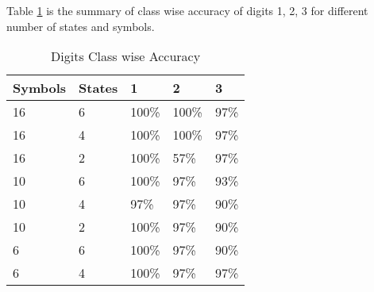 Table \ref{table:1} is the summary of class wise accuracy of digits 1, 2, 3 for different number of states and symbols.

\hspace*{-1cm}\begin{table}[h]
	\centering
	\begin{tabular}{|l|l|l|l|l|}
		\hline

\textbf{Symbols} & \textbf{States} & \textbf{1} & \textbf{2} & \textbf{3} \\		\hline		\hline
16               & 6               & 100\%          & 100\%          & 97\%       \\		\hline
16               & 4               & 100\%          & 100\%          & 97\%       \\		\hline
16               & 2               & 100\%         & 57\%      & 97\%       \\		\hline
10               & 6               & 100\%          & 97\%       & 93\%       \\		\hline
10               & 4               & 97\%       & 97\%      & 90\%        \\		\hline
10               & 2               & 100\%         & 97\%       & 90\%        \\		\hline
6                & 6               & 100\%         & 97\%      & 90\%        \\		\hline
6                & 4               & 100\%        & 97\%       & 97\%      \\		\hline

\end{tabular}\hspace*{-1cm}
\caption{Digits Class wise Accuracy}
\label{table:1}
\end{table}
